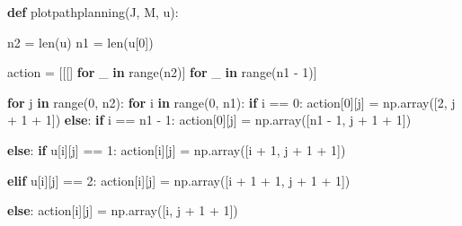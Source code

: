 \documentclass[
]{article}
\newenvironment{Shaded}{\begin{snugshade}}{\end{snugshade}}
\newcommand{\BuiltInTok}[1]{\textcolor[rgb]{0.00,0.23,0.31}{#1}}
\newcommand{\ControlFlowTok}[1]{\textcolor[rgb]{0.00,0.23,0.31}{\textbf{#1}}}
\newcommand{\DecValTok}[1]{\textcolor[rgb]{0.68,0.00,0.00}{#1}}
\newcommand{\KeywordTok}[1]{\textcolor[rgb]{0.00,0.23,0.31}{\textbf{#1}}}
\newcommand{\NormalTok}[1]{\textcolor[rgb]{0.00,0.23,0.31}{#1}}
\newcommand{\OperatorTok}[1]{\textcolor[rgb]{0.37,0.37,0.37}{#1}}
\begin{document}
\begin{Shaded}
\begin{Highlighting}[]
\KeywordTok{def}\NormalTok{ plotpathplanning(J, M, u):}

\NormalTok{    n2 }\OperatorTok{=} \BuiltInTok{len}\NormalTok{(u)}
\NormalTok{    n1 }\OperatorTok{=} \BuiltInTok{len}\NormalTok{(u[}\DecValTok{0}\NormalTok{])}

\NormalTok{    action }\OperatorTok{=}\NormalTok{ [[[] }\ControlFlowTok{for}\NormalTok{ \_ }\KeywordTok{in} \BuiltInTok{range}\NormalTok{(n2)] }\ControlFlowTok{for}\NormalTok{ \_ }\KeywordTok{in} \BuiltInTok{range}\NormalTok{(n1 }\OperatorTok{{-}} \DecValTok{1}\NormalTok{)]}

    \ControlFlowTok{for}\NormalTok{ j }\KeywordTok{in} \BuiltInTok{range}\NormalTok{(}\DecValTok{0}\NormalTok{, n2):}
        \ControlFlowTok{for}\NormalTok{ i }\KeywordTok{in} \BuiltInTok{range}\NormalTok{(}\DecValTok{0}\NormalTok{, n1):}
            \ControlFlowTok{if}\NormalTok{ i }\OperatorTok{==} \DecValTok{0}\NormalTok{:}
\NormalTok{                action[}\DecValTok{0}\NormalTok{][j] }\OperatorTok{=}\NormalTok{ np.array([}\DecValTok{2}\NormalTok{, j }\OperatorTok{+} \DecValTok{1} \OperatorTok{+} \DecValTok{1}\NormalTok{])}
            \ControlFlowTok{else}\NormalTok{:}
                \ControlFlowTok{if}\NormalTok{ i }\OperatorTok{==}\NormalTok{ n1 }\OperatorTok{{-}} \DecValTok{1}\NormalTok{:}
\NormalTok{                    action[}\DecValTok{0}\NormalTok{][j] }\OperatorTok{=}\NormalTok{ np.array([n1 }\OperatorTok{{-}} \DecValTok{1}\NormalTok{, j }\OperatorTok{+} \DecValTok{1} \OperatorTok{+} \DecValTok{1}\NormalTok{])}

                \ControlFlowTok{else}\NormalTok{:}
                    \ControlFlowTok{if}\NormalTok{ u[i][j] }\OperatorTok{==} \DecValTok{1}\NormalTok{:}
\NormalTok{                        action[i][j] }\OperatorTok{=}\NormalTok{ np.array([i }\OperatorTok{+} \DecValTok{1}\NormalTok{, j }\OperatorTok{+} \DecValTok{1} \OperatorTok{+} \DecValTok{1}\NormalTok{])}

                    \ControlFlowTok{elif}\NormalTok{ u[i][j] }\OperatorTok{==} \DecValTok{2}\NormalTok{:}
\NormalTok{                        action[i][j] }\OperatorTok{=}\NormalTok{ np.array([i }\OperatorTok{+} \DecValTok{1} \OperatorTok{+} \DecValTok{1}\NormalTok{, j }\OperatorTok{+} \DecValTok{1} \OperatorTok{+} \DecValTok{1}\NormalTok{])}

                    \ControlFlowTok{else}\NormalTok{:}
\NormalTok{                        action[i][j] }\OperatorTok{=}\NormalTok{ np.array([i, j }\OperatorTok{+} \DecValTok{1} \OperatorTok{+} \DecValTok{1}\NormalTok{])}


\end{Highlighting}
\end{Shaded}
\end{document}
